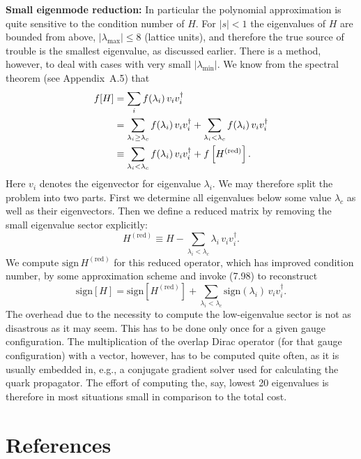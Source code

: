 \textbf{Small eigenmode reduction:} In particular the polynomial approximation
is quite sensitive to the condition number of $H$. For $|s| < 1$ the
eigenvalues of $H$ are bounded from above, $|\lambda_{\max}| \leq 8$ (lattice
units), and therefore the true source of trouble is the smallest eigenvalue,
as discussed earlier. There is a method, however, to deal with cases with very
small $|\lambda_{\min}|$. We know from the spectral theorem (see
Appendix~A.5) that
\begin{align}
  f[H] &= \sum_i f(\lambda_i)\,v_i v_i^\dagger \notag\\
  &= \sum_{\lambda_i \geq \lambda_c} f(\lambda_i)\,v_i v_i^\dagger
    + \sum_{\lambda_i < \lambda_c} f(\lambda_i)\,v_i v_i^\dagger \notag\\
  &\equiv \sum_{\lambda_i < \lambda_c} f(\lambda_i)\,v_i v_i^\dagger
    + f\left[H^{\mathrm{(red)}}\right].
\end{align}
Here $v_i$ denotes the eigenvector for eigenvalue $\lambda_i$. We may
therefore split the problem into two parts. First we determine all eigenvalues
below some value $\lambda_c$ as well as their eigenvectors. Then we define a
reduced matrix by removing the small eigenvalue sector explicitly:
\begin{equation}
  H^{\mathrm{(red)}} \equiv H - \sum_{\lambda_i < \lambda_c}
  \lambda_i\,v_i v_i^\dagger .
\end{equation}
We compute $\mathrm{sign}\,H^{\mathrm{(red)}}$ for this reduced operator,
which has improved condition number, by some approximation scheme and invoke
(7.98) to reconstruct
\begin{equation}
  \mathrm{sign}[H] = \mathrm{sign}\left[H^{\mathrm{(red)}}\right]
  + \sum_{\lambda_i < \lambda_c}\mathrm{sign}(\lambda_i)\,v_i v_i^\dagger .
\end{equation}
The overhead due to the necessity to compute the low-eigenvalue sector is not
as disastrous as it may seem. This has to be done only once for a given gauge
configuration. The multiplication of the overlap Dirac operator (for that gauge
configuration) with a vector, however, has to be computed quite often, as it is
usually embedded in, e.g., a conjugate gradient solver used for calculating
the quark propagator. The effort of computing the, say, lowest 20 eigenvalues
is therefore in most situations small in comparison to the total cost.

\section*{References}

